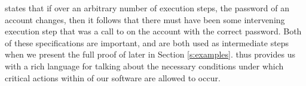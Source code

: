  states that if over an arbitrary number of execution steps, the password of an account changes,
then it follows that there must have been some intervening execution step that was a call to  on the account 
with the correct password. Both of these specifications are important, and are both used as intermediate steps
when we present the full proof of  later in Section \ref{s:examples}.
\Nec thus provides us with a rich language for talking about the necessary conditions
under which critical actions within of our software are allowed to occur. 
 




